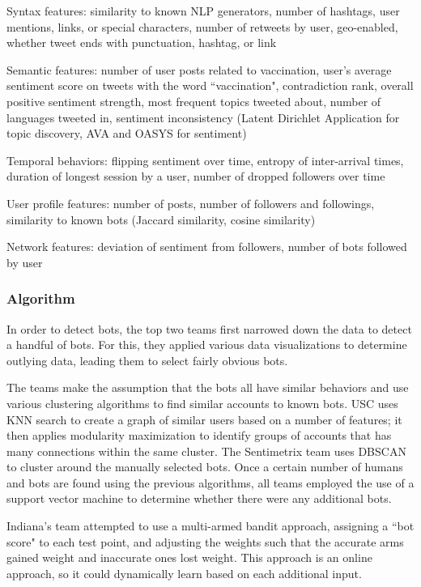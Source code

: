 \documentclass[11pt, oneside]{article}   	%
\begin{document}
Syntax features: similarity to known NLP generators, number of hashtags, user mentions, links, or special characters, number of retweets by user, geo-enabled, whether tweet ends with punctuation, hashtag, or link

Semantic features: number of user posts related to vaccination, user's average sentiment score on tweets with the word ``vaccination", contradiction rank, overall positive sentiment strength, most frequent topics tweeted about, number of languages tweeted in, sentiment inconsistency (Latent Dirichlet Application for topic discovery, AVA and OASYS for sentiment)

Temporal behaviors: flipping sentiment over time, entropy of inter-arrival times, duration of longest session by a user, number of dropped followers over time

User profile features: number of posts, number of followers and followings, similarity to known bots (Jaccard similarity, cosine similarity)

Network features: deviation of sentiment from followers, number of bots followed by user

\subsubsection*{Algorithm}

\quad In order to detect bots, the top two teams first narrowed down the data to detect a handful of bots.
For this, they applied various data visualizations to determine outlying data, leading them to select fairly obvious bots.

\quad The teams make the assumption that the bots all have similar behaviors and use various clustering algorithms to find similar accounts to known bots.
USC uses KNN search to create a graph of similar users based on a number of features; it then applies modularity maximization to identify groups of accounts that has many connections within the same cluster.
The Sentimetrix team uses DBSCAN to cluster around the manually selected bots.
Once a certain number of humans and bots are found using the previous algorithms, all teams employed the use of a support vector machine to determine whether there were any additional bots.

\quad Indiana's team attempted to use a multi-armed bandit approach, assigning a ``bot score" to each test point, and adjusting the weights such that the accurate arms gained weight and inaccurate ones lost weight.
This approach is an online approach, so it could dynamically learn based on each additional input.
\end{document}
